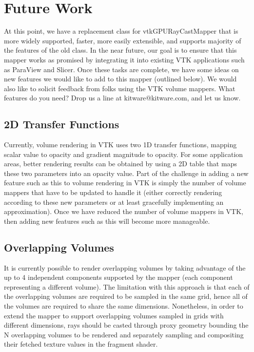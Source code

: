 \section{Future Work}
\label{future-work}
At this point, we have a replacement class for vtkGPURayCastMapper that is more
widely supported, faster, more easily extensible, and supports majority of the
features of the old class. In the near future, our goal is to ensure that this
mapper works as promised by integrating it into existing VTK applications such
as ParaView and Slicer. Once these tasks are complete, we have some ideas on new
features we would like to add to this mapper (outlined below). We would also
like to solicit feedback from folks using the VTK volume mappers. What features
do you need? Drop us a line at kitware@kitware.com, and let us know.

\subsection{2D Transfer Functions}
\label{2d-transfer-functions}
Currently, volume rendering in VTK uses two 1D transfer functions, mapping
scalar value to opacity and gradient magnitude to opacity. For some application
areas, better rendering results can be obtained by using a 2D table that maps
these two parameters into an opacity value. Part of the challenge in adding a
new feature such as this to volume rendering in VTK is simply the number of
volume mappers that have to be updated to handle it (either correctly rendering
according to these new parameters or at least gracefully implementing an
approximation). Once we
have reduced the number of volume mappers in VTK, then adding new features such
as this will become more manageable.

\subsection{Overlapping Volumes}
\label{overlapping-volumes}
It is currently possible to render overlapping volumes by taking advantage of
the up to 4 independent components supported by the mapper (each component
representing a different volume).
The limitation with this approach is that each of the overlapping volumes are
required to be sampled in the same grid, hence all of the volumes are required
to share the same dimensions.  Nonetheless, in order to extend the mapper to
support overlapping volumes sampled in grids with different dimensions, rays
should be casted through proxy geometry bounding the N overlapping volumes to be
rendered and separately sampling and compositing their fetched texture values in
the fragment shader.

